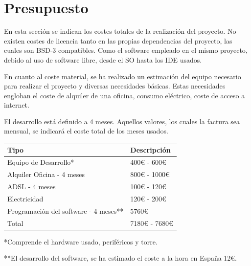\documentclass[11pt]{article}
\begin{document}
\section{Presupuesto}
\label{sec:orgccd35d9}

En esta sección se indican los costes totales de la realización del proyecto. No existen costes de
licencia tanto en las propias dependencias del proyecto, las cuales son BSD-3 compatibles. Como el software
empleado en el mismo proyecto, debido al uso de software libre, desde el SO hasta los IDE usados.

En cuanto al coste material, se ha realizado un estimación del equipo necesario para realizar el proyecto y diversas necesidades básicas.
Estas necesidades engloban el coste de alquiler de una oficina, consumo eléctrico, coste de acceso a internet.

El desarrollo está definido a 4 meses. Aquellos valores, los cuales la factura sea mensual, se indicará el coste total de los meses usados.

\begin{center}
\begin{tabular}{ll}
Tipo & Descripción\\
\hline
Equipo de Desarrollo* & 400€ - 600€\\
Alquiler Oficina - 4 meses & 800€ - 1000€\\
ADSL - 4 meses & 100€ - 120€\\
Electricidad & 120€ - 200€\\
Programación del software - 4 meses** & 5760€\\
\hline
Total & 7180€ - 7680€\\
\end{tabular}
\end{center}

*Comprende el hardware usado, periféricos y torre.

**El desarrollo del software, se ha estimado el coste a la hora en España 12€.


\renewcommand{\refname}{Bibliografía}

\newpage



\end{document}
